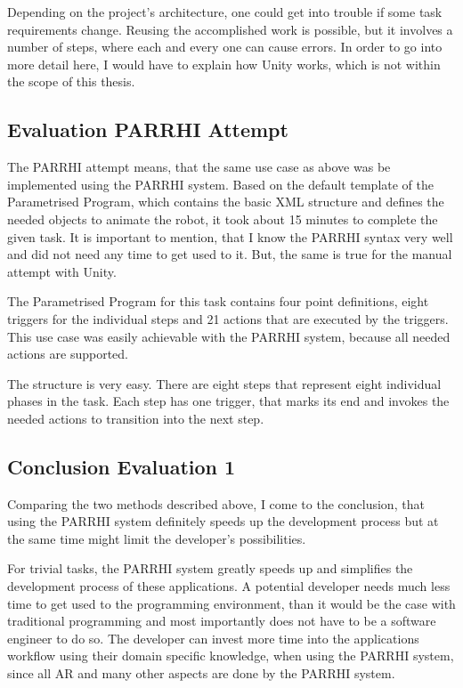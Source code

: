 Depending on the project's architecture, one could get into trouble if some task requirements change. Reusing the accomplished work is possible, but it involves a number of steps, where each and every one can cause errors. In order to go into more detail here, I would have to explain how Unity works, which is not within the scope of this thesis. 

\subsection{Evaluation PARRHI Attempt}
The PARRHI attempt means, that the same use case as above was be implemented using the PARRHI system. Based on the default template of the Parametrised Program, which contains the basic XML structure and defines the needed objects to animate the robot, it took about 15 minutes to complete the given task. It is important to mention, that I know the PARRHI syntax very well and did not need any time to get used to it. But, the same is true for the manual attempt with Unity.

The Parametrised Program for this task contains four point definitions, eight triggers for the individual steps and 21 actions that are executed by the triggers. This use case was easily achievable with the PARRHI system, because all needed actions are supported. 

The structure is very easy. There are eight steps that represent eight individual phases in the task. Each step has one trigger, that marks its end and invokes the needed actions to transition into the next step. 

\subsection{Conclusion Evaluation 1}
Comparing the two methods described above, I come to the conclusion, that using the PARRHI system definitely speeds up the development process but at the same time might limit the developer's possibilities. 

For trivial tasks, the PARRHI system greatly speeds up and simplifies the development process of these applications. A potential developer needs much less time to get used to the programming environment, than it would be the case with traditional programming and most importantly does not have to be a software engineer to do so. The developer can invest more time into the applications workflow using their domain specific knowledge, when using the PARRHI system, since all AR and many other aspects are done by the PARRHI system.

